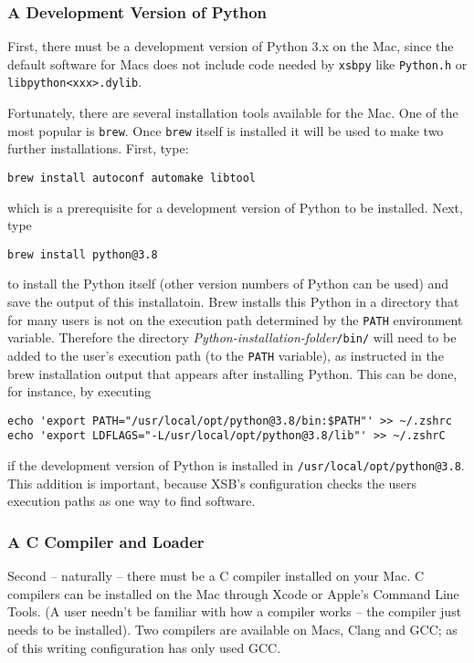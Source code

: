 \subsubsection{A Development Version of Python}

First, there must be a development version of Python 3.x on the Mac,
since the default software for Macs does not include code needed by
{\tt xsbpy} like {\tt Python.h} or {\tt libpython<xxx>.dylib}.

Fortunately, there are several installation tools available for the
Mac.  One of the most popular is {\tt brew}.  Once {\tt brew} itself
is installed it will be used to make two further installations.
First, type:

{\tt brew install autoconf automake libtool}

\noindent
which is a prerequisite for a development version of Python to be
installed.  Next, type 

{\tt brew install python@3.8}

\noindent
to install the Python itself (other version numbers of Python can be used)
and save the output of this installatoin.  Brew installs this Python in a
directory that for many users is not on the execution path determined by
the \texttt{PATH} environment variable.  Therefore the directory
\emph{Python-installation-folder}\texttt{/bin/} will need to be added to
the user's execution path (to the \texttt{PATH} variable), as instructed in
the brew installation output that appears after installing Python.
This can be done, for instance, by executing
\begin{verbatim}
echo 'export PATH="/usr/local/opt/python@3.8/bin:$PATH"' >> ~/.zshrc
echo 'export LDFLAGS="-L/usr/local/opt/python@3.8/lib"' >> ~/.zshrC 
\end{verbatim}
if the development version of
Python is installed in \texttt{/usr/local/opt/python@3.8}. This
addition is important, because XSB's configuration checks the users
execution paths as one way to find software.

\subsubsection{A C Compiler and Loader}

Second -- naturally -- there must be a C compiler installed on your
Mac.  C compilers can be installed on the Mac through Xcode or Apple's
Command Line Tools.  (A user needn't be familiar with how a compiler
works -- the compiler just needs to be installed).  Two compilers are
available on Macs, Clang and GCC; as of this writing configuration has
only used GCC.

